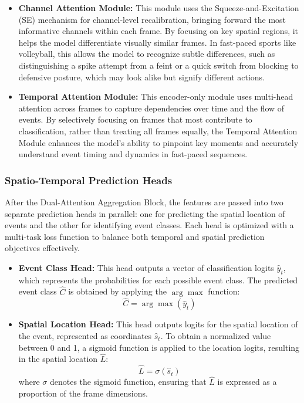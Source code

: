 \documentclass[conference]{IEEEtran}
\begin{document}
\begin{itemize}
    \item \textbf{Channel Attention Module:} This module uses the Squeeze-and-Excitation (SE) mechanism \cite{8578843} for channel-level recalibration, bringing forward the most informative channels within each frame. By focusing on key spatial regions, it helps the model differentiate visually similar frames. In fast-paced sports like volleyball, this allows the model to recognize subtle differences, such as distinguishing a spike attempt from a feint or a quick switch from blocking to defensive posture, which may look alike but signify different actions.

    \item \textbf{Temporal Attention Module:} This encoder-only module uses multi-head attention \cite{10.5555/3295222.3295349} across frames to capture dependencies over time and the flow of events. By selectively focusing on frames that most contribute to classification, rather than treating all frames equally, the Temporal Attention Module enhances the model’s ability to pinpoint key moments and accurately understand event timing and dynamics in fast-paced sequences.
\end{itemize}


\subsubsection{Spatio-Temporal Prediction Heads}

After the Dual-Attention Aggregation Block, the features are passed into two separate prediction heads in parallel: one for predicting the spatial location of events and the other for identifying event classes. Each head is optimized with a multi-task loss function to balance both temporal and spatial prediction objectives effectively.

\begin{itemize}
    \item \textbf{Event Class Head:} This head outputs a vector of classification logits \(\hat{y}_t\), which represents the probabilities for each possible event class. The predicted event class \(\hat{C}\) is obtained by applying the \(\arg\max\) function:
    \[
    \hat{C} = \arg\max(\hat{y}_t)
    \]

    \item \textbf{Spatial Location Head:} This head outputs logits for the spatial location of the event, represented as coordinates \(\hat{s}_t\). To obtain a normalized value between 0 and 1, a sigmoid function is applied to the location logits, resulting in the spatial location \(\hat{L}\):
    \[
    \hat{L} = \sigma(\hat{s}_t)
    \]
    where \(\sigma\) denotes the sigmoid function, ensuring that \(\hat{L}\) is expressed as a proportion of the frame dimensions.
\end{itemize}
\end{document}
